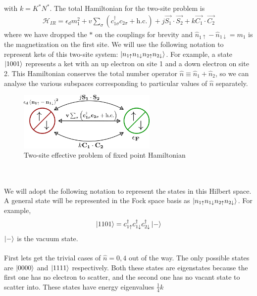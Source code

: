 \documentclass[twoside,11pt]{report}
\numberwithin{equation}{section}
\begin{document}
with \(k = K^* N^*\). The total Hamiltonian for the two-site problem is
\begin{equation}\begin{aligned}
	\mathcal{H}_{IR} = \epsilon_d m_1^2 + v\sum_{\sigma}\left(c^\dagger_{1\sigma}c_{2\sigma} + \text{h.c.} \right) + j\vec{S_1}\cdot\vec{S_2} + k \vec{C_1}\cdot\vec{C_2}
\end{aligned}\end{equation}
where we have dropped the \(*\) on the couplings for brevity and \(\hat n_{1 \uparrow} - \hat n_{1 \downarrow}=m_1\) is the magnetization on the first site. We will use the following notation to represent kets of this two-site system: \(\ket{n_{1 \uparrow}n_{1 \downarrow}n_{2 \uparrow}n_{2 \downarrow}}\). For example, a state \(\ket{1001}\) represents a ket with an up electron on site 1 and a down electron on site 2. This Hamiltonian conserves the total number operator \(\hat n \equiv \hat n_1 + \hat n_2\), so we can analyse the various subspaces corresponding to particular values of \(\hat n\) separately.
\begin{figure}[htpb]
	\centering
	\includegraphics[width=0.6\textwidth]{../figures/two_site_problem.png}
	\caption{Two-site effective problem of fixed point Hamiltonian}
	\label{twosite}

\end{figure}
\\\\We will adopt the following notation to represent the states in this Hilbert space. A general state will be represented in the Fock space basis as \(\ket{n_{1 \uparrow}n_{1 \downarrow}n_{2 \uparrow}n_{2 \downarrow}}\). For example,
\begin{equation}\begin{aligned}
	\ket{1101} = c^\dagger_{1 \uparrow}c^\dagger_{1 \downarrow}c^\dagger_{2 \downarrow}\ket{-}
\end{aligned}\end{equation}
\(\ket{-}\) is the vacuum state.
\\\\First lets get the trivial cases of \(\hat n = 0, 4\) out of the way. The only possible states are \(\ket{0000}\) and \(\ket{1111}\) respectively. Both these states are eigenstates because the first one has no electron to scatter, and the second one has no vacant state to scatter into. These states have energy eigenvalues \( \frac{1}{4}k\)
\end{document}
